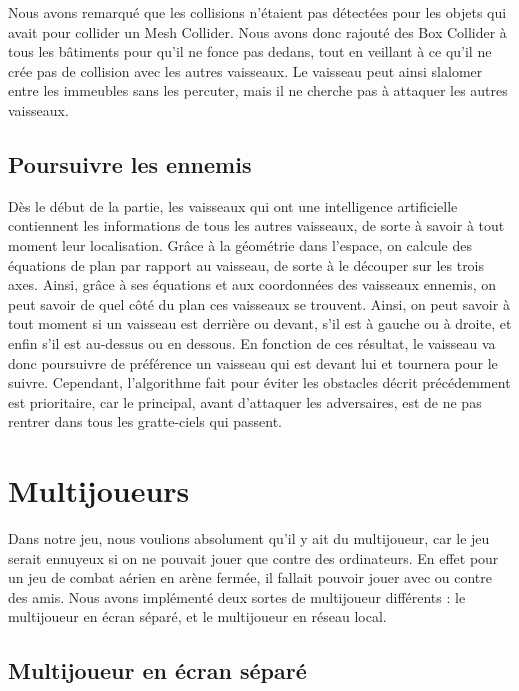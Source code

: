 \documentclass[12pt, titlepage]{article}
\begin{document}
\begin{spacing}{1.5}
Nous avons remarqué que les collisions n'étaient pas détectées pour les objets qui avait pour collider un Mesh Collider. Nous avons  donc rajouté des Box Collider à tous les bâtiments pour qu’il ne fonce pas dedans, tout en veillant à ce qu'il ne crée  pas de collision avec les autres vaisseaux. Le vaisseau peut ainsi slalomer entre les immeubles sans les percuter, mais il ne cherche pas à attaquer les autres vaisseaux.\\

\subsection{Poursuivre les ennemis}

Dès le début de la partie, les vaisseaux qui ont une intelligence artificielle contiennent les informations de tous les autres vaisseaux, de sorte à savoir à tout moment leur localisation. Grâce à la géométrie dans l'espace, on calcule des équations de plan par rapport au vaisseau, de sorte à le découper sur les trois axes. Ainsi, grâce à ses équations et aux coordonnées des vaisseaux ennemis, on peut savoir de quel côté du plan ces vaisseaux se trouvent. Ainsi, on peut savoir à tout moment si un vaisseau est derrière ou devant, s'il est à gauche ou à droite, et enfin s'il est au-dessus ou en dessous. En fonction de ces résultat, le vaisseau va donc poursuivre de préférence un vaisseau qui est devant lui et tournera pour le suivre. Cependant, l'algorithme fait pour éviter les obstacles décrit précédemment est prioritaire, car le principal, avant d'attaquer les adversaires, est de ne pas rentrer dans tous les gratte-ciels qui passent.

\newpage
\section{Multijoueurs}

Dans notre jeu, nous voulions absolument qu'il y ait du multijoueur, car le jeu serait ennuyeux si on ne pouvait jouer que contre des ordinateurs. En effet pour un jeu de combat aérien en arène fermée, il fallait pouvoir jouer avec ou contre des amis. Nous avons implémenté deux sortes de multijoueur différents : le multijoueur en écran séparé, et le multijoueur en réseau local.\\

\subsection{Multijoueur en écran séparé}


\end{spacing}
\end{document}
